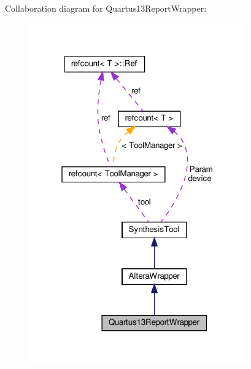 Collaboration diagram for Quartus13\+Report\+Wrapper\+:
\nopagebreak
\begin{figure}[H]
\begin{center}
\leavevmode
\includegraphics[width=265pt]{db/d0e/classQuartus13ReportWrapper__coll__graph}
\end{center}
\end{figure}
